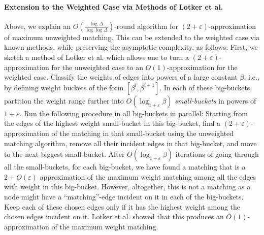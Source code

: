 \documentclass[11pt]{article}
\newcommand{\ktodo}[1]{\todo[color=yellow]{\textbf{Keren}: #1}}
\newcommand{\eps}{\varepsilon}
\begin{document}
\paragraph{Extension to the Weighted Case via Methods of Lotker et al.} Above, we explain an $O(\frac{\log \Delta}{\log\log \Delta})$-round algorithm for $(2+\eps)$-approximation of maximum unweighted matching. This can be extended to the weighted case via known methods, while preserving the asymptotic complexity, as follows: First, we sketch a method of Lotker et al.\cite{lotker2009distributed} which allows one to turn a $(2+\eps)$-approximation for the unweighted case to an $O(1)$-approximation for the weighted case. Classify the weights of edges into powers of a large constant $\beta$, i.e., by defining weight buckets of the form $[\beta^{i}, \beta^{i+1}]$. In each of these big-buckets, partition the weight range further into $O(\log_{1+\eps} \beta)$ \emph{small-buckets} in powers of $1+\eps$. Run the following procedure in all big-buckets in parallel: Starting from the edges of the highest weight small-bucket in this big-bucket, find a $(2+\eps)$-approximation of the matching in that small-bucket using the unweighted matching algorithm, remove all their incident edges in that big-bucket, and move to the next biggest small-bucket. After $O(\log_{1+\eps} \beta)$ iterations of going through all the small-buckets, for each big-bucket, we have found a matching that is a $2+O(\eps)$ %
approximation of the maximum weight matching among all the edges with weight in this big-bucket. However, altogether, this is not a matching as a node might have a ``matching''-edge incident on it in each of the big-buckets. Keep each of these chosen edges only if it has the highest weight among the chosen edges incident on it.  Lotker et al.\cite{lotker2009distributed} showed that this produces an $O(1)$-approximation of the maximum weight matching.
\end{document}
